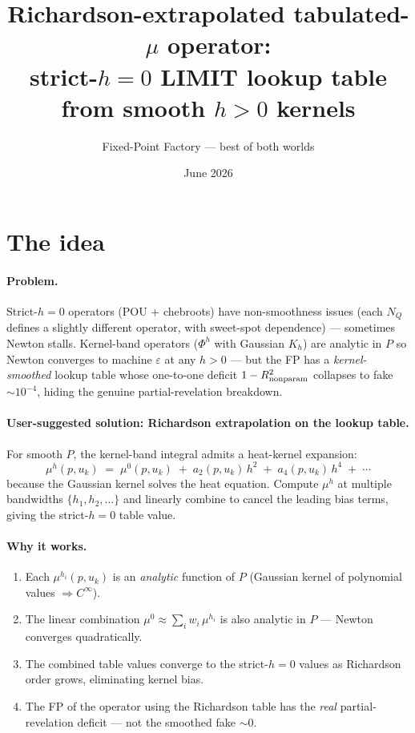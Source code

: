 \documentclass[11pt]{article}
\title{Richardson-extrapolated tabulated-$\mu$ operator:\\
       strict-$h{=}0$ LIMIT lookup table from smooth $h{>}0$ kernels}
\author{Fixed-Point Factory --- best of both worlds}
\date{June 2026}
\begin{document}
\maketitle

\section*{The idea}

\paragraph{Problem.} Strict-$h{=}0$ operators (POU + chebroots) have
non-smoothness issues (each $N_Q$ defines a slightly different operator,
with sweet-spot dependence) — sometimes Newton stalls. Kernel-band
operators ($\Phi^h$ with Gaussian $K_h$) are analytic in $P$ so Newton
converges to machine $\varepsilon$ at any $h > 0$ --- but the FP has a
\emph{kernel-smoothed} lookup table whose one-to-one deficit
$1-R^2_{\rm nonparam}$ collapses to fake $\sim 10^{-4}$, hiding the
genuine partial-revelation breakdown.

\paragraph{User-suggested solution: Richardson extrapolation on the lookup
table.} For smooth $P$, the kernel-band integral admits a heat-kernel
expansion:
\[
   \mu^h(p, u_k) \;=\; \mu^0(p, u_k) \;+\; a_2(p, u_k)\, h^2
                    \;+\; a_4(p, u_k)\, h^4 \;+\; \cdots
\]
because the Gaussian kernel solves the heat equation. Compute $\mu^h$
at multiple bandwidths $\{h_1, h_2, \dots\}$ and linearly combine to
cancel the leading bias terms, giving the strict-$h{=}0$ table value.

\paragraph{Why it works.}
\begin{enumerate}
  \item Each $\mu^{h_i}(p, u_k)$ is an \emph{analytic} function of $P$
        (Gaussian kernel of polynomial values $\Rightarrow C^\infty$).
  \item The linear combination
        $\mu^0 \approx \sum_i w_i\, \mu^{h_i}$ is also analytic in $P$
        — Newton converges quadratically.
  \item The combined table values converge to the strict-$h{=}0$ values
        as Richardson order grows, eliminating kernel bias.
  \item The FP of the operator using the Richardson table has the
        \emph{real} partial-revelation deficit --- not the smoothed
        fake $\sim 0$.
\end{enumerate}
\end{document}
